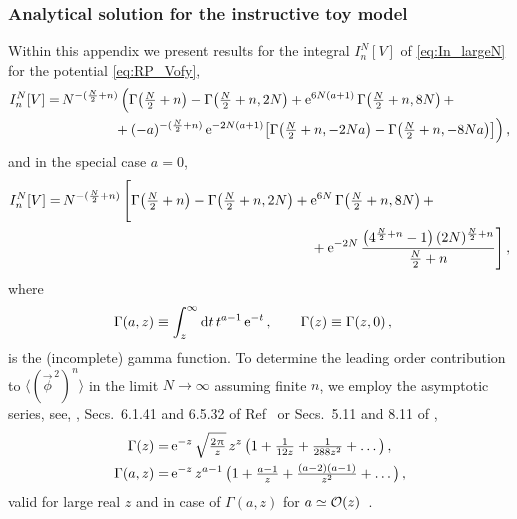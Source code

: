 \subsubsection{Analytical solution for the instructive toy model}
\label{app:RP_integrals}
Within this appendix we present results for the integral $I_n^N [ V ]$ of \cref{eq:In_largeN} for the potential \eqref{eq:RP_Vofy},
\begin{align}
	I_n^N [ V ] =& \, N^{- ( \frac{N}{2} + n )} \, \Big( \Gamma \big( \tfrac{N}{2} + n \big) - \Gamma \big( \tfrac{N}{2} + n, 2 N \big) + \mathrm{e}^{6 N ( a + 1 )} \, \Gamma \big( \tfrac{N}{2} + n, 8 N \big)\, +\notag\\
	&\qquad\qquad+( - a )^{- ( \frac{N}{2} + n )} \, \mathrm{e}^{- 2 N ( a + 1 )}\big[ \Gamma \big( \tfrac{N}{2} + n, - 2 N a \big) - \Gamma \big( \tfrac{N}{2} + n, - 8 N a \big) \big] \Big) \, ,		\label{eq:InNV_a0}
\end{align}
and in the special case $a = 0$,
	\begin{align}
		 I_n^N [ V ] 	= &\,  N^{- ( \frac{N}{2} + n )} \, \Bigg[ \Gamma \big( \tfrac{N}{2} + n \big) - \Gamma \big( \tfrac{N}{2} + n, 2 N \big)
 + \mathrm{e}^{6 N} \, \Gamma \big( \tfrac{N}{2} + n, 8 N \big)\, + \notag\\
&\qquad\qquad\qquad\qquad\qquad\qquad\qquad\qquad\qquad+\mathrm{e}^{-2 N} \, \frac{\big( 4^{\frac{N}{2} + n} - 1 \big) \, ( 2 N )^{\frac{N}{2} + n}}{\frac{N}{2} + n} \Bigg] \, ,  \label{eq:InNV}
	\end{align}
where 
\begin{align}
	&	\Gamma ( a, z ) \equiv \int_{z}^{\infty} \dif t \, t^{a - 1} \, \eu^{-t} \, ,	\qquad	\Gamma ( z ) \equiv \Gamma ( z, 0 ) \, ,
\end{align}
is the (incomplete) gamma function. To determine the leading order contribution to $\langle ( \vec{\phi}^{\, 2} )^n \rangle$ in the limit ${N \rightarrow \infty}$ assuming finite $n$, we employ the asymptotic series, see, \eg{}, Secs.~6.1.41 and 6.5.32 of Ref~\cite{abramowitz+stegun} or Secs.~5.11 and 8.11 of ,
\begin{subequations}\label{eq:GammaFktSeries}
\begin{align}
	\Gamma ( z ) = \, & \mathrm{e}^{-z} \, \sqrt{\tfrac{2 \mkern1.0mu\uppi\mkern1.0mu }{z}} \, z^z \, \big( 1 + \tfrac{1}{12 z} + \tfrac{1}{288 z^2} + \ldots \big) \, ,	\\
	\Gamma ( a, z ) = \, & \mathrm{e}^{-z} \, z^{a - 1} \, \big( 1 + \tfrac{a-1}{z} + \tfrac{( a - 2 ) ( a - 1 )}{z^2} + \ldots \big) \, ,	
\end{align}
\end{subequations}
valid for large real $z$ and in case of $\Gamma ( a, z )$ for $a \simeq \mathcal{O} ( z )$~\cite{Temme1975}.

